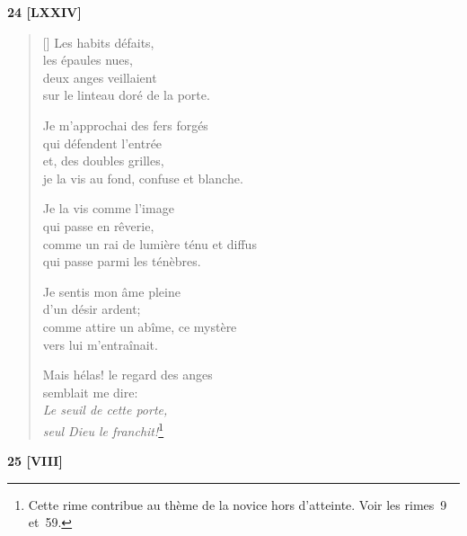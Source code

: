 \documentclass[a4paper,12pt]{book}
\begin{document}
\bigskip

\begin{center}
  \textbf{24 [LXXIV]}
\end{center}

\settowidth{\versewidth}{je la vis au fond, confuse et blanche.}

\begin{verse}[\versewidth]
  Les habits défaits, \\
  les épaules nues, \\
  deux anges veillaient \\
  sur le linteau doré de la porte.

  Je m'approchai des fers forgés \\
  qui défendent l'entrée \\
  et, des doubles grilles, \\
  je la vis au fond, confuse et blanche.

  Je la vis comme l'image \\
  qui passe en rêverie, \\
  comme un rai de lumière ténu et diffus \\
  qui passe parmi les ténèbres.

  Je sentis mon âme pleine \\
  d'un désir ardent; \\
  comme attire un abîme, ce mystère \\
  vers lui m'entraînait.

  Mais hélas! le regard des anges \\
  semblait me dire: \\
  \emph{Le seuil de cette porte, \\
  seul Dieu le franchit!}\footnote{Cette rime contribue au thème de la
  novice hors d'atteinte. Voir les rimes~9 et~59.}
\end{verse}

\bigskip

\begin{center}
  \textbf{25 [VIII]}
\end{center}

\settowidth{\versewidth}{et m'inonder de leur lumière, et avec elles}
\end{document}
